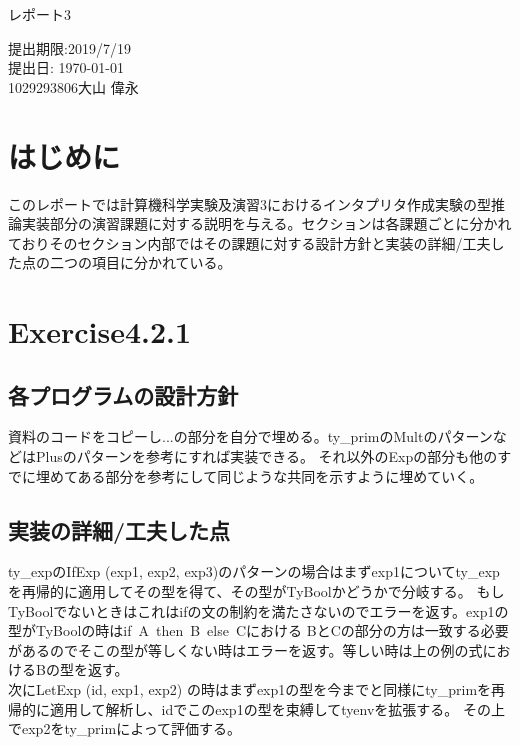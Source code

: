 \documentclass[a4paper,11pt,oneside,openany]{jsarticle}
\begin{document}
    \begin{center}

      \vspace*{35mm}
      \huge レポート3 \par
      \vspace{90mm}
      \Large 提出期限:2019/7/19\\
       提出日: \today \\
      \vspace{15mm}
      \Large
       1029293806\hspace{5mm}大山 偉永\par

      \vspace{10mm}
    \end{center}
    \clearpage
    \addtocounter{page}{-1}

    \newpage

\section{はじめに}
  このレポートでは計算機科学実験及演習3におけるインタプリタ作成実験の型推論実装部分の演習課題に対する説明を与える。セクションは各課題ごとに分かれておりそのセクション内部ではその課題に対する設計方針と実装の詳細/工夫した点の二つの項目に分かれている。

\section{Exercise4.2.1}
\subsection{各プログラムの設計方針}
  資料のコードをコピーし...の部分を自分で埋める。ty\_primのMultのパターンなどはPlusのパターンを参考にすれば実装できる。
  それ以外のExpの部分も他のすでに埋めてある部分を参考にして同じような共同を示すように埋めていく。
\subsection{実装の詳細/工夫した点}
    ty\_expのIfExp (exp1, exp2, exp3)のパターンの場合はまずexp1についてty\_expを再帰的に適用してその型を得て、その型がTyBoolかどうかで分岐する。
    もしTyBoolでないときはこれはifの文の制約を満たさないのでエラーを返す。exp1の型がTyBoolの時はif\ A\ then\ B\ else\ Cにおける
    BとCの部分の方は一致する必要があるのでそこの型が等しくない時はエラーを返す。等しい時は上の例の式におけるBの型を返す。\\
    次にLetExp (id, exp1, exp2) の時はまずexp1の型を今までと同様にty\_primを再帰的に適用して解析し、idでこのexp1の型を束縛してtyenvを拡張する。
    その上でexp2をty\_primによって評価する。\\\\
\end{document}
